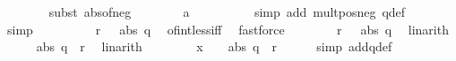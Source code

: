 \begin{isabellebody}
\ \ \ \ \ \ \isamarkupfalse%
\ {\isacharparenleft}{\kern0pt}subst\ abs{\isacharunderscore}{\kern0pt}of{\isacharunderscore}{\kern0pt}neg{\isacharparenright}{\kern0pt}\isanewline
\ \ \ \ \ \ \isamarkupfalse%
\ a\ \isanewline
\ \ \ \ \ \ \ \isamarkupfalse%
\ {\isacharparenleft}{\kern0pt}simp\ add{\isacharcolon}{\kern0pt}\ mult{\isacharunderscore}{\kern0pt}pos{\isacharunderscore}{\kern0pt}neg{}\ q{\isacharunderscore}{\kern0pt}def{\isacharparenright}{\kern0pt}\isanewline
\ \ \ \ \ \ \isamarkupfalse%
\ simp\isanewline
\ \ \ \ \isamarkupfalse%
\ \isamarkupfalse%
\ {\isachardoublequoteopen}{\isacharminus}{\kern0pt}{\isacharparenleft}{\kern0pt}{}\ {\isacharcircum}{\kern0pt}\ {\isacharparenleft}{\kern0pt}r{\isacharplus}{\kern0pt}{}{\isacharparenright}{\kern0pt}{\isacharplus}{\kern0pt}{}{\isacharparenright}{\kern0pt}\ {\isacharless}{\kern0pt}\ {\isacharminus}{\kern0pt}\ abs\ q{\isachardoublequoteclose}\ \isamarkupfalse%
\ of{\isacharunderscore}{\kern0pt}int{\isacharunderscore}{\kern0pt}less{\isacharunderscore}{\kern0pt}iff\ \isamarkupfalse%
\ fastforce\isanewline
\ \ \ \ \isamarkupfalse%
\ {\isachardoublequoteopen}{\isacharminus}{\kern0pt}{\isacharparenleft}{\kern0pt}{}\ {\isacharcircum}{\kern0pt}\ {\isacharparenleft}{\kern0pt}r{\isacharplus}{\kern0pt}{}{\isacharparenright}{\kern0pt}{\isacharparenright}{\kern0pt}\ {\isasymle}\ {\isacharminus}{\kern0pt}\ abs\ q{\isachardoublequoteclose}\ \isamarkupfalse%
\ linarith\isanewline
\ \ \ \ \isamarkupfalse%
\ {\isachardoublequoteopen}abs\ q\ {\isasymle}\ {}{\isacharcircum}{\kern0pt}{\isacharparenleft}{\kern0pt}r{\isacharplus}{\kern0pt}{}{\isacharparenright}{\kern0pt}{\isachardoublequoteclose}\ \isamarkupfalse%
\ linarith\isanewline
\ \ \isamarkupfalse%
\isanewline
\isanewline
\ \ \isamarkupfalse%
\ \isamarkupfalse%
\ {\isachardoublequoteopen}x\ {\isacharequal}{\kern0pt}\ {}\ {\isasymLongrightarrow}\ abs\ q\ {\isasymle}\ {}{\isacharcircum}{\kern0pt}{\isacharparenleft}{\kern0pt}r{\isacharplus}{\kern0pt}{}{\isacharparenright}{\kern0pt}{\isachardoublequoteclose}\isanewline
\ \ \ \ \isamarkupfalse%
\ {\isacharparenleft}{\kern0pt}simp\ add{\isacharcolon}{\kern0pt}q{\isacharunderscore}{\kern0pt}def{\isacharparenright}{\kern0pt}\isanewline

\end{isabellebody}
